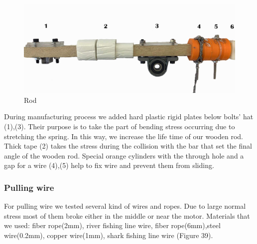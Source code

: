 \documentclass{article}
\begin{document}
\begin{figure}[H]
\centering
\includegraphics[width=0.7\linewidth]{71}
\caption{Rod}
\end{figure}

During manufacturing process we added hard plastic rigid plates below bolts' hat (1),(3). Their purpose is to take the part of bending stress occurring due to stretching the spring. In this way, we increase the life time of our wooden rod. Thick tape (2) takes the stress during the collision with the bar that set the final angle of the wooden rod.
Special orange cylinders with the through hole and a gap for a wire (4),(5) help to fix wire and prevent them from sliding.  

\subsubsection*{Pulling wire}
For pulling wire we tested several kind of wires and ropes. Due to large normal stress most of them broke either in the middle or near the motor. Materials that we used: fiber rope(2mm), river fishing line wire, fiber rope(6mm),steel wire(0.2mm), copper wire(1mm), shark fishing line wire (Figure 39).
\end{document}
